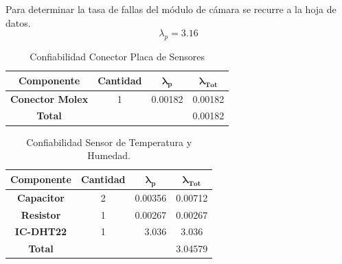 Para determinar la tasa de fallas del módulo de cámara se recurre a la hoja de datos.
\begin{equation}
\lambda_p = 3.16
\end{equation}
\begin{table}[H]
\centering
\begin{tabular}{|c|clc|}
\hline
\textbf{Componente}     & \multicolumn{1}{c|}{\textbf{Cantidad}} & \multicolumn{1}{c|}{$\boldsymbol{\lambda_p}$} & $\boldsymbol{\lambda_{Tot}}$  \\ \hline
\textbf{Conector Molex} & \multicolumn{1}{c|}{1}                 & \multicolumn{1}{r|}{0.00182}              & 0.00182                      \\ \hline
\textbf{Total}          & \multicolumn{1}{l}{}                   &                                           & \multicolumn{1}{r|}{0.00182} \\ \hline
\end{tabular}
\caption{Confiabilidad Conector Placa de Sensores}
\label{confsensores}
\end{table}
\begin{table}[H]
\centering
\begin{tabular}{|c|crc|}
\hline
\textbf{Componente}         & \multicolumn{1}{c|}{\textbf{Cantidad}} & \multicolumn{1}{c|}{$\boldsymbol{\lambda_p}$}        & $\boldsymbol{\lambda_{Tot}}$ \\ \hline
\textbf{Capacitor} & \multicolumn{1}{c|}{2}                 & \multicolumn{1}{r|}{0.00356}                         & 0.00712                      \\ \hline
\textbf{Resistor}  & \multicolumn{1}{c|}{1}                 & \multicolumn{1}{r|}{\cellcolor[HTML]{FFFFFF}0.00267} & 0.00267                      \\ \hline
\textbf{IC-DHT22}  & \multicolumn{1}{c|}{1}                 & \multicolumn{1}{r|}{3.036}                           & 3.036                        \\ \hline
\textbf{Total}     & \multicolumn{1}{l}{}                   & \multicolumn{1}{l}{}                                 & \multicolumn{1}{r|}{3.04579} \\ \hline
\end{tabular}
\caption{Confiabilidad Sensor de Temperatura y Humedad.}
\label{tab:conftemphum}
\end{table}

